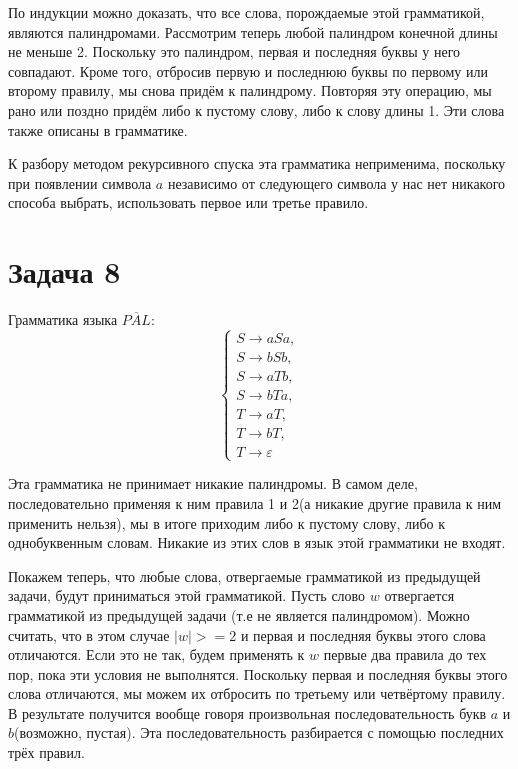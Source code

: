 \documentclass[11pt]{article}
\begin{document}
По индукции можно доказать, что все слова, порождаемые этой грамматикой, являются палиндромами.
Рассмотрим теперь любой палиндром конечной длины не меньше 2. Поскольку это палиндром, первая и последняя
буквы у него совпадают. Кроме того, отбросив первую и последнюю буквы по первому или второму
правилу, мы снова придём к палиндрому. Повторяя эту операцию, мы рано или поздно придём либо
к пустому слову, либо к слову длины 1. Эти слова также описаны в грамматике.

К разбору методом рекурсивного спуска эта грамматика неприменима, поскольку при появлении
символа $a$ независимо от следующего символа у нас нет никакого способа выбрать, использовать
первое или третье правило.
\section{Задача 8}
\label{sec:orgff8013e}
Грамматика языка \(\overline{PAL}\):
\begin{equation}
\begin{cases}
S \rightarrow aSa, \\
S \rightarrow bSb, \\
S \rightarrow aTb, \\
S \rightarrow bTa, \\
T \rightarrow aT, \\
T \rightarrow bT, \\
T \rightarrow \varepsilon
\end{cases}
\end{equation}

Эта грамматика не принимает никакие палиндромы. В самом деле, последовательно применяя к ним
правила 1 и 2(а никакие другие правила к ним применить нельзя), мы в итоге приходим либо к
пустому слову, либо к однобуквенным словам. Никакие из этих слов в язык этой грамматики не
входят.

Покажем теперь, что любые слова, отвергаемые грамматикой из предыдущей задачи, будут
приниматься этой грамматикой. Пусть слово $w$ отвергается грамматикой из предыдущей задачи
(т.е не является палиндромом).
Можно считать, что в этом случае $|w| >= 2$ и первая и последняя буквы этого слова отличаются.
Если это не так, будем применять к $w$ первые два правила до тех пор, пока эти условия не
выполнятся. Поскольку первая и последняя буквы этого слова отличаются, мы можем их отбросить
по третьему или четвёртому правилу. В результате получится вообще говоря произвольная
последовательность букв $a$ и $b$(возможно, пустая). Эта последовательность разбирается с
помощью последних трёх правил.
\end{document}
